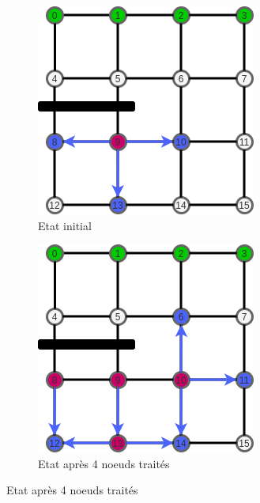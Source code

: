 \documentclass[a4paper]{article}
\begin{document}
\begin{figure}[ht]
    \centering
    \begin{subfigure}{.5\textwidth}
        \centering
        \includegraphics[scale=0.7]{parcours_graphe1.png}
        \caption{Etat initial}
        \label{fig:parcours_graphe1}
    \end{subfigure}%
    \begin{subfigure}{.5\textwidth}
        \centering
        \includegraphics[scale=0.7]{parcours_graphe2.png}
        \caption{Etat après 4 noeuds traités}
        \label{fig:parcours_graphe2}
    \end{subfigure}%
    
    
    

\end{figure}
\end{document}
